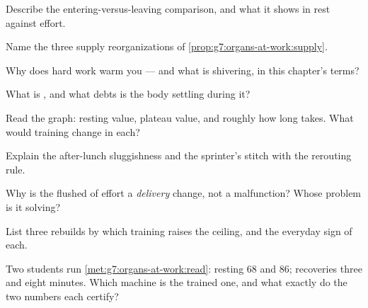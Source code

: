 \begin{exercise}[$\star$]\label{exo:g7:organs-at-work:3}
Describe the entering-versus-leaving  comparison, and
what it shows in rest against effort.
\end{exercise}

\begin{exercise}[$\star$]\label{exo:g7:organs-at-work:4}
Name the three supply reorganizations of
\cref{prop:g7:organs-at-work:supply}.
\end{exercise}

\begin{exercise}[$\star$]\label{exo:g7:organs-at-work:5}
Why does hard work warm you --- and what is shivering, in
this chapter's terms?
\end{exercise}

\begin{exercise}[$\star$]\label{exo:g7:organs-at-work:6}
What is , and what debts is the body settling
during it?
\end{exercise}

\begin{exercise}[$\star\star$]\label{exo:g7:organs-at-work:7}
Read the  graph: resting value, plateau value, and
roughly how long  takes. What would training
change in each?
\end{exercise}

\begin{exercise}[$\star\star$]\label{exo:g7:organs-at-work:8}
Explain the after-lunch sluggishness and the sprinter's
stitch with the rerouting rule.
\end{exercise}

\begin{exercise}[$\star\star$]\label{exo:g7:organs-at-work:9}
Why is the flushed  of effort a \emph{delivery}
change, not a malfunction? Whose problem is it solving?
\end{exercise}

\begin{exercise}[$\star\star$]\label{exo:g7:organs-at-work:10}
List three rebuilds by which training raises the ceiling,
and the everyday sign of each.
\end{exercise}

\begin{exercise}[$\star\star$]\label{exo:g7:organs-at-work:11}
Two students run \cref{met:g7:organs-at-work:read}:
resting  $68$ and $86$; recoveries three and eight
minutes. Which machine is the trained one, and what
exactly do the two numbers each certify?
\end{exercise}


